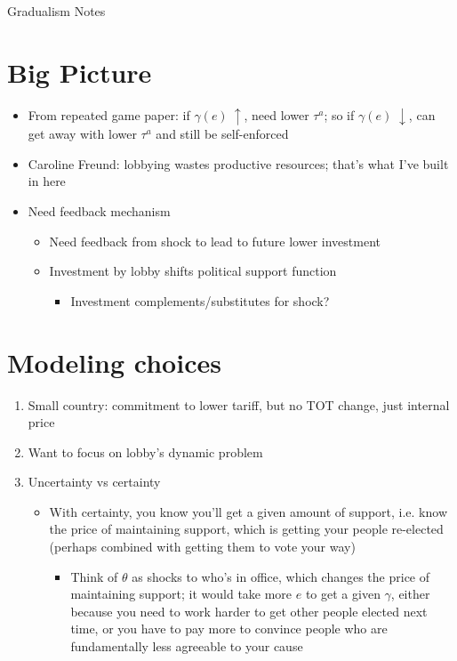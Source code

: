 \documentclass[12pt]{article}
\newcommand{\ta}{\theta}
\newcommand{\ga}{\gamma}
\begin{document}
\begin{center}
Gradualism Notes
\end{center}


\section{Big Picture}
\begin{itemize}
	\item From repeated game paper: if $\ga(e) \: \uparrow$, need lower $\tau^a$; so if $\ga(e) \; \downarrow$, can get away with lower $\tau^a$ and still be self-enforced
	\item Caroline Freund: lobbying wastes productive resources; that's what I've built in here
	\item Need feedback mechanism
		\begin{itemize}
			\item Need feedback from shock to lead to future lower investment
			\item Investment by lobby shifts political support function
				\begin{itemize}
					\item Investment complements/substitutes for shock?
				\end{itemize}
		\end{itemize}
\end{itemize}

\section{Modeling choices}

\begin{enumerate}
	\item Small country: commitment to lower tariff, but no TOT change, just internal price
	\item Want to focus on lobby's dynamic problem
	\item Uncertainty vs certainty
		\begin{itemize}
			\item With certainty,  you know you'll get a given amount of support, i.e. know the price of maintaining support, which is getting your people re-elected (perhaps combined with getting them to vote your way)
				\begin{itemize}
					\item Think of $\ta$ as shocks to who's in office, which changes the price of maintaining support; it would take more $e$ to get a given $\ga$, either because you need to work harder to get other people elected next time, or you have to pay more to convince people who are fundamentally less agreeable to your cause
				\end{itemize}
		\end{itemize}
\end{enumerate}
\end{document}
